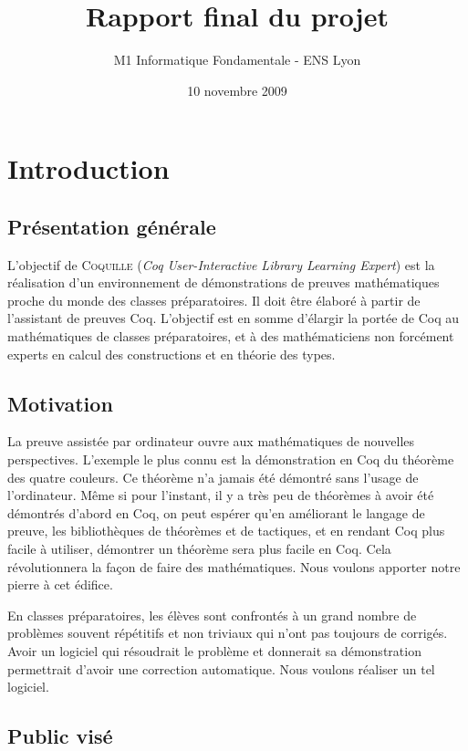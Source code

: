 \documentclass[a4paper,10pt]{article}
\date{10 novembre 2009}
\title{Rapport final du projet \coquille{}}
\author{M1 Informatique Fondamentale - ENS Lyon}
\newcommand{\coquille}{\textsc{Coquille}}
\begin{document}
\maketitle
\newpage
\setcounter{section}{1}
\section*{Introduction}

\subsection{Présentation générale}

L'objectif de \coquille{} (\emph{Coq User-Interactive Library Learning Expert}) est la réalisation d'un environnement de démonstrations de preuves mathématiques proche du monde des classes préparatoires. Il doit être élaboré à partir de l'assistant de preuves Coq. L'objectif est en somme d'élargir la portée de Coq au mathématiques de classes préparatoires, et à des mathématiciens non forcément experts en calcul des constructions et en théorie des types.

\subsection{Motivation}

La preuve assistée par ordinateur ouvre aux mathématiques de nouvelles perspectives. L'exemple le plus connu est la démonstration en Coq du théorème des quatre couleurs. Ce théorème n'a jamais été démontré sans l'usage de l'ordinateur. Même si pour l'instant, il y a très peu de théorèmes à avoir été démontrés d'abord en Coq, on peut espérer qu'en améliorant le langage de preuve, les bibliothèques de théorèmes et de tactiques, et en rendant Coq plus facile à utiliser, démontrer un théorème sera plus facile en Coq. Cela révolutionnera la façon de faire des mathématiques. Nous voulons apporter notre pierre à cet édifice.

En classes préparatoires, les élèves sont confrontés à un grand nombre de problèmes souvent répétitifs et non triviaux qui n'ont pas toujours de corrigés. Avoir un logiciel qui résoudrait le problème et donnerait sa démonstration permettrait d'avoir une correction automatique. Nous voulons réaliser un tel logiciel.

\subsection{Public visé}
\end{document}
